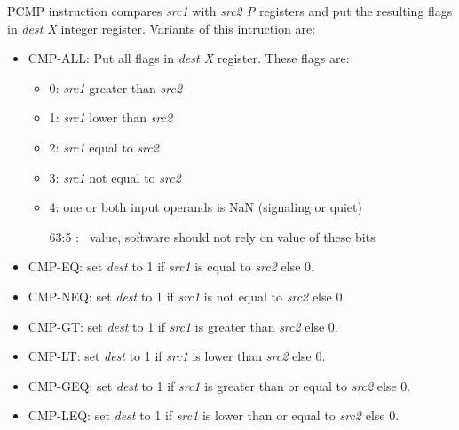 PCMP instruction compares {\em src1} with {\em src2 P} registers and put the resulting flags in {\em dest X} integer register.
Variants of this intruction are:
\begin{itemize}[topsep=0pt]
    \item CMP-ALL: Put all flags in {\em dest X} register.
    These flags are:
        \begin{itemize}[noitemsep,topsep=0pt]
            \item 0: {\em src1} greater than {\em src2}
            \item 1: {\em src1} lower than {\em src2}
            \item 2: {\em src1} equal to {\em src2}
            \item 3: {\em src1} not equal to {\em src2}
            \item 4: one or both input operands is NaN (signaling or quiet)
            \item [63:5]: \implementationdefined~value, software should not rely on value of these bits
        \end{itemize}
    \item CMP-EQ: set {\em dest} to 1 if {\em src1} is equal to {\em src2} else 0.
    \item CMP-NEQ: set {\em dest} to 1 if {\em src1} is not equal to {\em src2} else 0.
    \item CMP-GT: set {\em dest} to 1 if {\em src1} is greater than {\em src2} else 0.
    \item CMP-LT: set {\em dest} to 1 if {\em src1} is lower than {\em src2} else 0.
    \item CMP-GEQ: set {\em dest} to 1 if {\em src1} is greater than or equal to {\em src2} else 0.
    \item CMP-LEQ: set {\em dest} to 1 if {\em src1} is lower than or equal to {\em src2} else 0.
\end{itemize}

